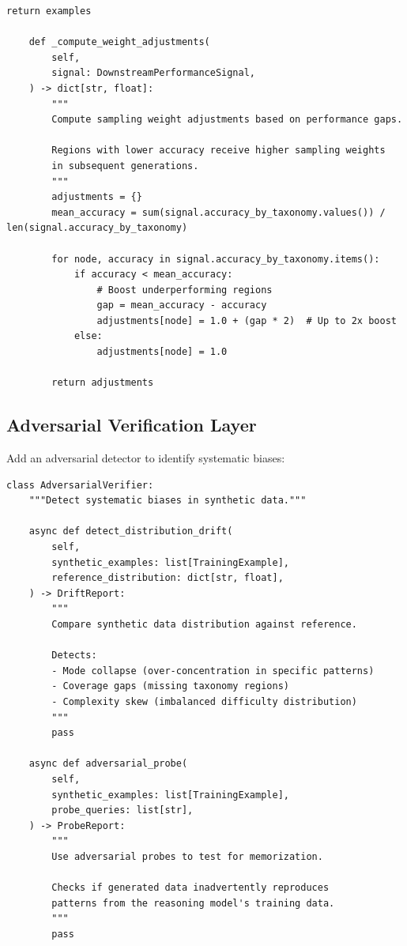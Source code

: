 \begin{lstlisting}[language=jsonx,caption={Closed-loop validation architecture.}]
        return examples
    
    def _compute_weight_adjustments(
        self,
        signal: DownstreamPerformanceSignal,
    ) -> dict[str, float]:
        """
        Compute sampling weight adjustments based on performance gaps.
        
        Regions with lower accuracy receive higher sampling weights
        in subsequent generations.
        """
        adjustments = {}
        mean_accuracy = sum(signal.accuracy_by_taxonomy.values()) / len(signal.accuracy_by_taxonomy)
        
        for node, accuracy in signal.accuracy_by_taxonomy.items():
            if accuracy < mean_accuracy:
                # Boost underperforming regions
                gap = mean_accuracy - accuracy
                adjustments[node] = 1.0 + (gap * 2)  # Up to 2x boost
            else:
                adjustments[node] = 1.0
        
        return adjustments
\end{lstlisting}

\subsection{Adversarial Verification Layer}

Add an adversarial detector to identify systematic biases:

\begin{lstlisting}[language=jsonx,caption={Adversarial verification for distribution drift.}]
class AdversarialVerifier:
    """Detect systematic biases in synthetic data."""
    
    async def detect_distribution_drift(
        self,
        synthetic_examples: list[TrainingExample],
        reference_distribution: dict[str, float],
    ) -> DriftReport:
        """
        Compare synthetic data distribution against reference.
        
        Detects:
        - Mode collapse (over-concentration in specific patterns)
        - Coverage gaps (missing taxonomy regions)
        - Complexity skew (imbalanced difficulty distribution)
        """
        pass
    
    async def adversarial_probe(
        self,
        synthetic_examples: list[TrainingExample],
        probe_queries: list[str],
    ) -> ProbeReport:
        """
        Use adversarial probes to test for memorization.
        
        Checks if generated data inadvertently reproduces
        patterns from the reasoning model's training data.
        """
        pass
\end{lstlisting}

